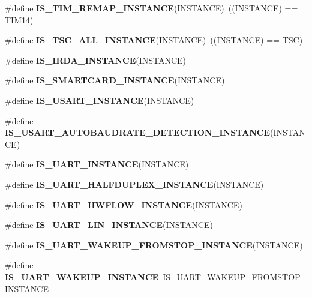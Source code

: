 \begin{DoxyCompactItemize}
\item 
\mbox{\label{group___exported__macro_ga6bb03cf116b07bfe1bd527f8ab61a7f9}} 
\#define {\bfseries I\+S\+\_\+\+T\+I\+M\+\_\+\+R\+E\+M\+A\+P\+\_\+\+I\+N\+S\+T\+A\+N\+CE}(I\+N\+S\+T\+A\+N\+CE)~((I\+N\+S\+T\+A\+N\+CE) == T\+I\+M14)
\item 
\mbox{\label{group___exported__macro_gaf29af2609f6b7748104a965262e95475}} 
\#define {\bfseries I\+S\+\_\+\+T\+S\+C\+\_\+\+A\+L\+L\+\_\+\+I\+N\+S\+T\+A\+N\+CE}(I\+N\+S\+T\+A\+N\+CE)~((I\+N\+S\+T\+A\+N\+CE) == T\+SC)
\item 
\#define {\bfseries I\+S\+\_\+\+I\+R\+D\+A\+\_\+\+I\+N\+S\+T\+A\+N\+CE}(I\+N\+S\+T\+A\+N\+CE)
\item 
\#define {\bfseries I\+S\+\_\+\+S\+M\+A\+R\+T\+C\+A\+R\+D\+\_\+\+I\+N\+S\+T\+A\+N\+CE}(I\+N\+S\+T\+A\+N\+CE)
\item 
\#define {\bfseries I\+S\+\_\+\+U\+S\+A\+R\+T\+\_\+\+I\+N\+S\+T\+A\+N\+CE}(I\+N\+S\+T\+A\+N\+CE)
\item 
\#define {\bfseries I\+S\+\_\+\+U\+S\+A\+R\+T\+\_\+\+A\+U\+T\+O\+B\+A\+U\+D\+R\+A\+T\+E\+\_\+\+D\+E\+T\+E\+C\+T\+I\+O\+N\+\_\+\+I\+N\+S\+T\+A\+N\+CE}(I\+N\+S\+T\+A\+N\+CE)
\item 
\#define {\bfseries I\+S\+\_\+\+U\+A\+R\+T\+\_\+\+I\+N\+S\+T\+A\+N\+CE}(I\+N\+S\+T\+A\+N\+CE)
\item 
\#define {\bfseries I\+S\+\_\+\+U\+A\+R\+T\+\_\+\+H\+A\+L\+F\+D\+U\+P\+L\+E\+X\+\_\+\+I\+N\+S\+T\+A\+N\+CE}(I\+N\+S\+T\+A\+N\+CE)
\item 
\#define {\bfseries I\+S\+\_\+\+U\+A\+R\+T\+\_\+\+H\+W\+F\+L\+O\+W\+\_\+\+I\+N\+S\+T\+A\+N\+CE}(I\+N\+S\+T\+A\+N\+CE)
\item 
\#define {\bfseries I\+S\+\_\+\+U\+A\+R\+T\+\_\+\+L\+I\+N\+\_\+\+I\+N\+S\+T\+A\+N\+CE}(I\+N\+S\+T\+A\+N\+CE)
\item 
\#define {\bfseries I\+S\+\_\+\+U\+A\+R\+T\+\_\+\+W\+A\+K\+E\+U\+P\+\_\+\+F\+R\+O\+M\+S\+T\+O\+P\+\_\+\+I\+N\+S\+T\+A\+N\+CE}(I\+N\+S\+T\+A\+N\+CE)
\item 
\mbox{\label{group___exported__macro_ga69e32d838272d886316fcfa378605ed0}} 
\#define {\bfseries I\+S\+\_\+\+U\+A\+R\+T\+\_\+\+W\+A\+K\+E\+U\+P\+\_\+\+I\+N\+S\+T\+A\+N\+CE}~I\+S\+\_\+\+U\+A\+R\+T\+\_\+\+W\+A\+K\+E\+U\+P\+\_\+\+F\+R\+O\+M\+S\+T\+O\+P\+\_\+\+I\+N\+S\+T\+A\+N\+CE
\item 

\end{DoxyCompactItemize}
